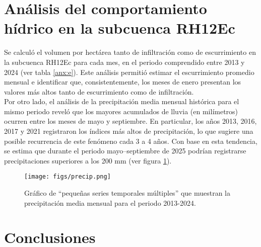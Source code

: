 \documentclass[12pt,letterpaper]{article}
\begin{document}
\section{Análisis del comportamiento hídrico en la subcuenca RH12Ec}

Se calculó el volumen por hectárea tanto de infiltración como de escurrimiento en la subcuenca RH12Ec para cada mes, en el periodo comprendido entre 2013 y 2024 (ver tabla \ref{anx:e}). Este análisis permitió estimar el escurrimiento promedio mensual e identificar que, consistentemente, los meses de enero presentan los valores más altos tanto de escurrimiento como de infiltración.\\

Por otro lado, el análisis de la precipitación media mensual histórica para el mismo periodo reveló que los mayores acumulados de lluvia (en milímetros) ocurren entre los meses de mayo y septiembre. En particular, los años 2013, 2016, 2017 y 2021 registraron los índices más altos de precipitación, lo que sugiere una posible recurrencia de este fenómeno cada 3 a 4 años. Con base en esta tendencia, se estima que durante el periodo mayo–septiembre de 2025 podrían registrarse precipitaciones superiores a los 200 mm (ver figura \ref{fig:precip}).

\begin{figure}[H]
    \centering
    \texttt{[image: figs/precip.png]}
    \caption{Gráfico de ``pequeñas series temporales múltiples'' que muestran la precipitación media mensual para el periodo 2013-2024.}
    \label{fig:precip}
\end{figure}

\section{Conclusiones}
\end{document}
